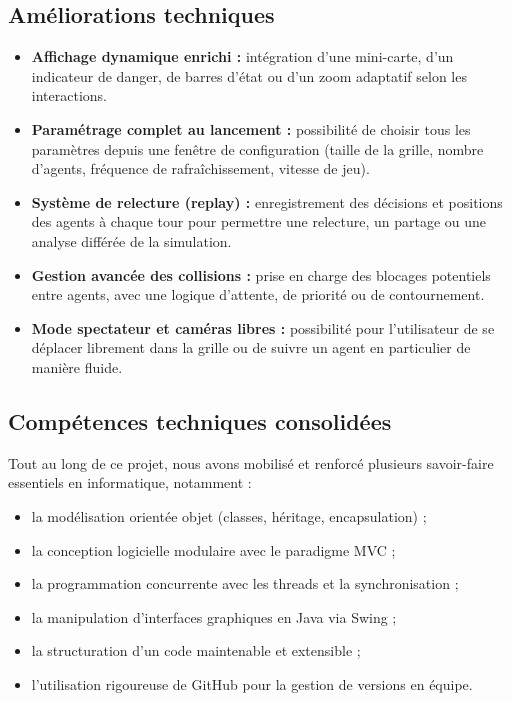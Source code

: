 \subsection{Améliorations techniques}

\begin{itemize}
    \item \textbf{Affichage dynamique enrichi :} intégration d’une mini-carte, d’un indicateur de danger, de barres d’état ou d’un zoom adaptatif selon les interactions.

    \item \textbf{Paramétrage complet au lancement :} possibilité de choisir tous les paramètres depuis une fenêtre de configuration (taille de la grille, nombre d’agents, fréquence de rafraîchissement, vitesse de jeu).

    \item \textbf{Système de relecture (replay) :} enregistrement des décisions et positions des agents à chaque tour pour permettre une relecture, un partage ou une analyse différée de la simulation.

    \item \textbf{Gestion avancée des collisions :} prise en charge des blocages potentiels entre agents, avec une logique d’attente, de priorité ou de contournement.

    \item \textbf{Mode spectateur et caméras libres :} possibilité pour l’utilisateur de se déplacer librement dans la grille ou de suivre un agent en particulier de manière fluide.
\end{itemize}


\subsection{Compétences techniques consolidées}

Tout au long de ce projet, nous avons mobilisé et renforcé plusieurs savoir-faire essentiels en informatique, notamment :

\begin{itemize}
    \item la modélisation orientée objet (classes, héritage, encapsulation) ;
    \item la conception logicielle modulaire avec le paradigme MVC ;
    \item la programmation concurrente avec les threads et la synchronisation ;
    \item la manipulation d’interfaces graphiques en Java via Swing ;
    \item la structuration d’un code maintenable et extensible ;
    \item l’utilisation rigoureuse de GitHub pour la gestion de versions en équipe.
\end{itemize}

